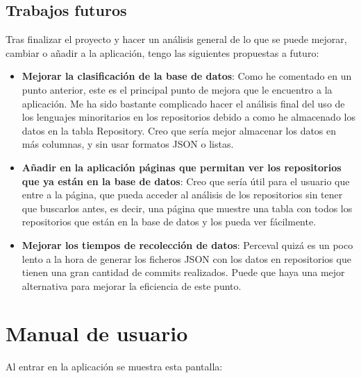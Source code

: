 \documentclass[a4paper, 12pt]{book}
\begin{document}
\section{Trabajos futuros}
\label{sec:trabajos_futuros}

Tras finalizar el proyecto y hacer un análisis general de lo que se puede mejorar, cambiar o añadir a la aplicación, tengo las siguientes propuestas a futuro:

\begin{itemize}
\item \textbf{Mejorar la clasificación de la base de datos}: Como he comentado en un punto anterior, este es el principal punto de mejora que le encuentro a la aplicación. Me ha sido bastante complicado hacer el análisis final del uso de los lenguajes minoritarios en los repositorios debido a como he almacenado los datos en la tabla Repository. Creo que sería mejor almacenar los datos en más columnas, y sin usar formatos JSON o listas.
\item \textbf{Añadir en la aplicación páginas que permitan ver los repositorios que ya están en la base de datos}: Creo que sería útil para el usuario que entre a la página, que pueda acceder al análisis de los repositorios sin tener que buscarlos antes, es decir, una página que muestre una tabla con todos los repositorios que están en la base de datos y los pueda ver fácilmente.
\item \textbf{Mejorar los tiempos de recolección de datos}: Perceval quizá es un poco lento a la hora de generar los ficheros JSON con los datos en repositorios que tienen una gran cantidad de commits realizados. Puede que haya una mejor alternativa para mejorar la eficiencia de este punto.
\end{itemize}

\cleardoublepage
\appendix
\chapter{Manual de usuario}
\label{app:manual}

Al entrar en la aplicación se muestra esta pantalla:
\end{document}
